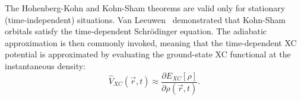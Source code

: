\documentclass[%
 aip,
 amsmath,amssymb,
preprint,%
]{revtex4-2}
\begin{document}
The Hohenberg-Kohn and Kohn-Sham theorems are valid only for stationary (time-independent) situations.
Van Leeuwen~\cite{vanleeuwenCausalitySymmetryTimeDependent1998} demonstrated that Kohn-Sham orbitals satisfy the time-dependent Schrödinger equation. 
The adiabatic approximation is then commonly invoked, meaning that the time-dependent XC potential is approximated by evaluating the ground-state XC functional at the instantaneous density:
\begin{equation}
	\hat V_{XC}(\vec{r}, t) \approx 
	\frac{\partial E_{XC}[\rho]}{\partial \rho(\vec{r}, t)}. \label{eq:adiabatic}
\end{equation}
\end{document}
